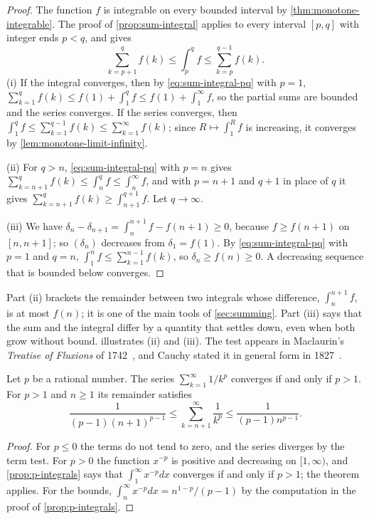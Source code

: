 \begin{proof}
The function $f$ is integrable on every bounded interval by \cref{thm:monotone-integrable}. The proof of \cref{prop:sum-integral} applies to every interval $[p,q]$ with integer ends $p<q$, and gives
\begin{equation}
\sum_{k=p+1}^qf(k)\le\int_p^qf\le\sum_{k=p}^{q-1}f(k).
\label{eq:sum-integral-pq}
\end{equation}
(i) If the integral converges, then by \eqref{eq:sum-integral-pq} with $p=1$, $\sum_{k=1}^qf(k)\le f(1)+\int_1^qf\le f(1)+\int_1^\infty f$, so the partial sums are bounded and the series converges. If the series converges, then $\int_1^qf\le\sum_{k=1}^{q-1}f(k)\le\sum_{k=1}^\infty f(k)$; since $R\mapsto\int_1^Rf$ is increasing, it converges by \cref{lem:monotone-limit-infinity}.

(ii) For $q>n$, \eqref{eq:sum-integral-pq} with $p=n$ gives $\sum_{k=n+1}^qf(k)\le\int_n^qf\le\int_n^\infty f$, and with $p=n+1$ and $q+1$ in place of $q$ it gives $\sum_{k=n+1}^{q}f(k)\ge\int_{n+1}^{q+1}f$. Let $q\to\infty$.

(iii) We have $\delta_n-\delta_{n+1}=\int_n^{n+1}f-f(n+1)\ge0$, because $f\ge f(n+1)$ on $[n,n+1]$; so $(\delta_n)$ decreases from $\delta_1=f(1)$. By \eqref{eq:sum-integral-pq} with $p=1$ and $q=n$, $\int_1^nf\le\sum_{k=1}^{n-1}f(k)$, so $\delta_n\ge f(n)\ge0$. A decreasing sequence that is bounded below converges.
\end{proof}

Part (ii) brackets the remainder between two integrals whose difference, $\int_n^{n+1}f$, is at most $f(n)$; it is one of the main tools of \cref{sec:summing}. Part (iii) says that the sum and the integral differ by a quantity that settles down, even when both grow without bound.  illustrates (ii) and (iii). The test appears in Maclaurin's \emph{Treatise of Fluxions} of 1742~\cite{maclaurin1742}, and Cauchy stated it in general form in 1827~\cite{knopp1990}.

\begin{corollary}[$p$-series]
\label{cor:p-series}
Let $p$ be a rational number. The series $\sum_{k=1}^\infty1/k^p$ converges if and only if $p>1$. For $p>1$ and $n\ge1$ its remainder satisfies
\[
\frac1{(p-1)(n+1)^{p-1}}\le\sum_{k=n+1}^\infty\frac1{k^p}\le\frac1{(p-1)n^{p-1}} .
\]
\end{corollary}

\begin{proof}
For $p\le0$ the terms do not tend to zero, and the series diverges by the term test. For $p>0$ the function $x^{-p}$ is positive and decreasing on $[1,\infty)$, and \cref{prop:p-integrals} says that $\int_1^\infty x^{-p}dx$ converges if and only if $p>1$; the theorem applies. For the bounds, $\int_n^\infty x^{-p}dx=n^{1-p}/(p-1)$ by the computation in the proof of \cref{prop:p-integrals}.
\end{proof}

